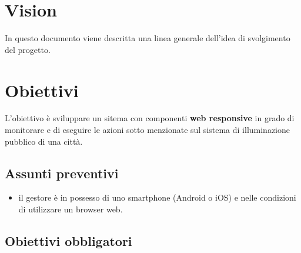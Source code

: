 \documentclass[
]{article}
\author{}
\date{}
\providecommand{\tightlist}{%
  \setlength{\itemsep}{0pt}\setlength{\parskip}{0pt}}
\begin{document}
\hypertarget{vision}{%
\section{Vision}\label{vision}}

In questo documento viene descritta una linea generale dell'idea di
svolgimento del progetto.

\hypertarget{obiettivi}{%
\section{Obiettivi}\label{obiettivi}}

L'obiettivo è sviluppare un sitema con componenti \textbf{web
responsive} in grado di monitorare e di eseguire le azioni sotto
menzionate sul sistema di illuminazione pubblico di una città.

\hypertarget{assunti-preventivi}{%
\subsection{Assunti preventivi}\label{assunti-preventivi}}

\begin{itemize}
\tightlist
\item
  il gestore è in possesso di uno smartphone (Android o iOS) e nelle
  condizioni di utilizzare un browser web.
\end{itemize}

\hypertarget{obiettivi-obbligatori}{%
\subsection{Obiettivi obbligatori}\label{obiettivi-obbligatori}}
\end{document}
